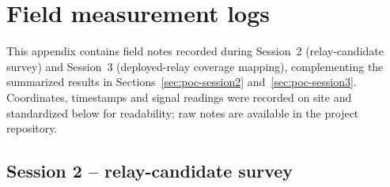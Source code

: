 \chapter{Field measurement logs}%
\label{ch:bijlage-veldnotities}

This appendix contains field notes recorded during Session~2 (relay-candidate
survey) and Session~3 (deployed-relay coverage mapping), complementing the summarized
results in Sections~\ref{sec:poc-session2} and~\ref{sec:poc-session3}. Coordinates,
timestamps and signal readings were recorded on site and standardized below for
readability; raw notes are available in the project repository.

\section{Session 2 -- relay-candidate survey}%
\label{sec:bijlage-session2}


